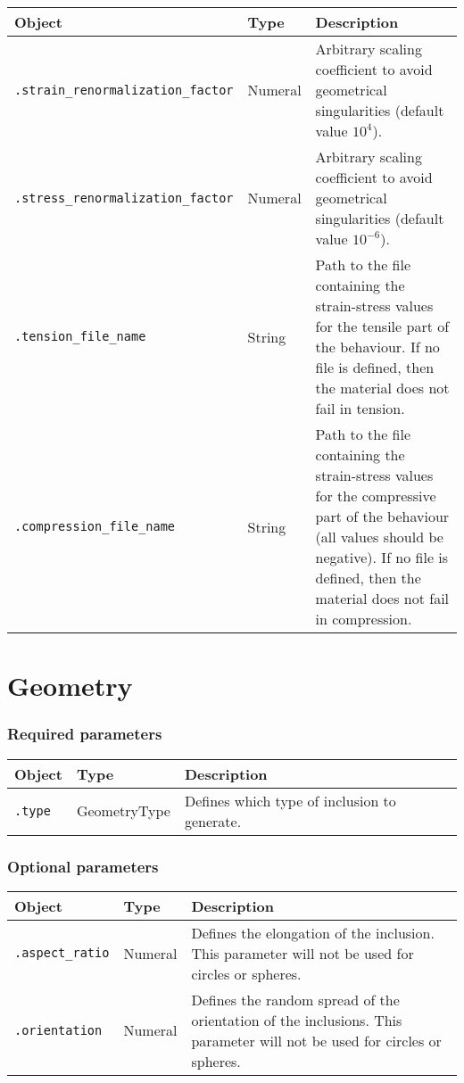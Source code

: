\documentclass[10pt]{article}
\begin{document}
\begin{tabularx}{\textwidth}{llX}
\hline 
Object & Type & Description \\ 
\hline 
\verb+.strain_renormalization_factor+ & Numeral & Arbitrary scaling coefficient to avoid geometrical singularities (default value $10^4$).\\
\verb+.stress_renormalization_factor+ & Numeral & Arbitrary scaling coefficient to avoid geometrical singularities (default value $10^{-6}$).\\
\verb+.tension_file_name+ & String & Path to the file containing the strain-stress values for the tensile part of the behaviour. If no file is defined, then the material does not fail in tension.\\
\verb+.compression_file_name+ & String & Path to the file containing the strain-stress values for the compressive part of the behaviour (all values should be negative). If no file is defined, then the material does not fail in compression.\\
\hline 
\end{tabularx}

\section{Geometry}

\subsubsection*{Required parameters}

\begin{tabularx}{\textwidth}{llX}
\hline 
Object & Type & Description \\ 
\hline 
\verb+.type+ & GeometryType & Defines which type of inclusion to generate. \\ 
\hline 
\end{tabularx}

\subsubsection*{Optional parameters}

\begin{tabularx}{\textwidth}{llX}
\hline 
Object & Type & Description \\ 
\hline 
\verb+.aspect_ratio+ & Numeral & Defines the elongation of the inclusion. This parameter will not be used for circles or spheres. \\ 
\verb+.orientation+ & Numeral & Defines the random spread of the orientation of the inclusions. This parameter will not be used for circles or spheres. \\ 
\hline 
\end{tabularx}
\end{document}
